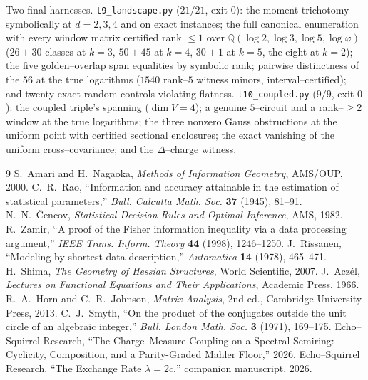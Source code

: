 \documentclass[11pt]{article}
\theoremstyle{definition}
\newcommand{\ph}{\varphi}
\newcommand{\Q}{\mathbb{Q}}
\begin{document}
Two final harnesses. \texttt{t9\_landscape.py} ($21/21$, exit $0$): the moment trichotomy
symbolically at $d=2,3,4$ and on exact instances; the full canonical enumeration with every
window matrix certified rank $\le1$ over $\Q(\log2,\log3,\log5,\log\ph)$ ($26+30$ classes at
$k=3$, $50+45$ at $k=4$, $30+1$ at $k=5$, the eight at $k=2$); the five golden--overlap span
equalities by symbolic rank; pairwise distinctness of the $56$ at the true logarithms ($1540$
rank--$5$ witness minors, interval--certified); and twenty exact random controls violating
flatness. \texttt{t10\_coupled.py} ($9/9$, exit $0$): the coupled triple's spanning
($\dim V=4$); a genuine $5$--circuit and a rank--$\ge2$ window at the true logarithms; the three
nonzero Gauss obstructions at the uniform point with certified sectional enclosures; the exact
vanishing of the uniform cross--covariance; and the $\Delta$--charge witness.

\begin{thebibliography}{9}
 S.~Amari and H.~Nagaoka, \emph{Methods of Information Geometry}, AMS/OUP, 2000.
 C.~R.~Rao, ``Information and accuracy attainable in the estimation of statistical
parameters,'' \emph{Bull. Calcutta Math. Soc.} \textbf{37} (1945), 81--91.
 N.~N.~\v{C}encov, \emph{Statistical Decision Rules and Optimal Inference}, AMS,
1982.
 R.~Zamir, ``A proof of the Fisher information inequality via a data processing
argument,'' \emph{IEEE Trans. Inform. Theory} \textbf{44} (1998), 1246--1250.
 J.~Rissanen, ``Modeling by shortest data description,'' \emph{Automatica}
\textbf{14} (1978), 465--471.
 H.~Shima, \emph{The Geometry of Hessian Structures}, World Scientific, 2007.
 J.~Acz\'el, \emph{Lectures on Functional Equations and Their Applications},
Academic Press, 1966.
 R.~A.~Horn and C.~R.~Johnson, \emph{Matrix Analysis}, 2nd ed., Cambridge University
Press, 2013.
 C.~J.~Smyth, ``On the product of the conjugates outside the unit circle of an
algebraic integer,'' \emph{Bull. London Math. Soc.} \textbf{3} (1971), 169--175.
 Echo--Squirrel Research, ``The Charge--Measure Coupling on a Spectral Semiring:
Cyclicity, Composition, and a Parity-Graded Mahler Floor,'' 2026.
 Echo--Squirrel Research, ``The Exchange Rate $\lambda=2c$,'' companion manuscript,
2026.
\end{thebibliography}
\end{document}
